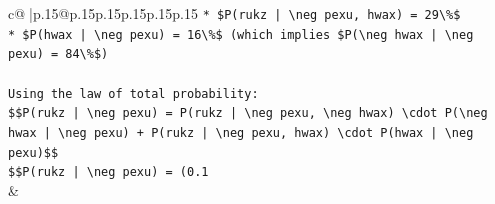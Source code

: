 \documentclass{article}
\begin{document}
{\begin{supertabular}{c@{$\;$}|p{.15\linewidth}@{}p{.15\linewidth}p{.15\linewidth}p{.15\linewidth}p{.15\linewidth}p{.15\linewidth}}
{{{\texttt{*   \$P(rukz | \textbackslash{}neg pexu, hwax) = 29\textbackslash{}\%\$} \\
\texttt{*   \$P(hwax | \textbackslash{}neg pexu) = 16\textbackslash{}\%\$ (which implies \$P(\textbackslash{}neg hwax | \textbackslash{}neg pexu) = 84\textbackslash{}\%\$)} \\
\\ 
\texttt{Using the law of total probability:} \\
\texttt{\$\$P(rukz | \textbackslash{}neg pexu) = P(rukz | \textbackslash{}neg pexu, \textbackslash{}neg hwax) \textbackslash{}cdot P(\textbackslash{}neg hwax | \textbackslash{}neg pexu) + P(rukz | \textbackslash{}neg pexu, hwax) \textbackslash{}cdot P(hwax | \textbackslash{}neg pexu)\$\$} \\
\texttt{\$\$P(rukz | \textbackslash{}neg pexu) = (0.1} \\
            }
        }
    }
    & \\ \\


\end{supertabular}}
\end{document}
